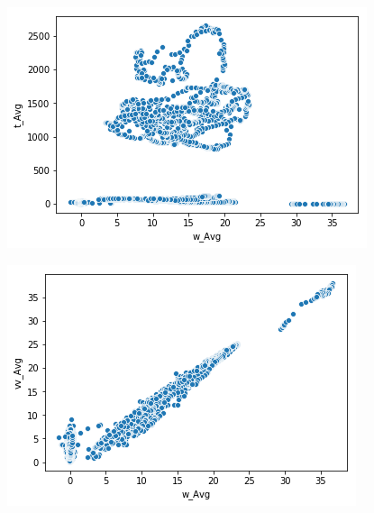 \documentclass[11pt, spanish]{report}
\begin{document}
\begin{figure}
\centering
\begin{minipage}{.5\textwidth}
  \centering
  \includegraphics[width=\linewidth]{1.png}
  \label{fig:test1}
\end{minipage}%
\begin{minipage}{.5\textwidth}
  \centering
  \includegraphics[width=\linewidth]{2.png}
  \label{fig:test2}
\end{minipage}
\end{figure}
\end{document}
